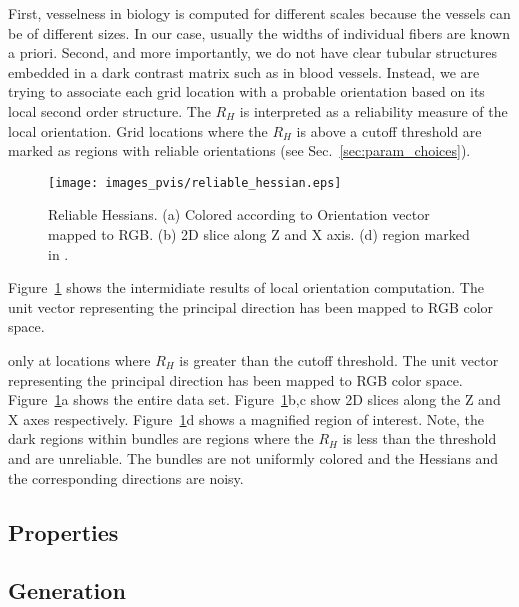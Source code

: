 First, vesselness in biology is computed for different scales because the vessels can be of different sizes. In our case, usually the widths of individual fibers are known a priori.
Second, and more importantly, we do not have clear tubular structures embedded in a dark contrast matrix such as in blood vessels.
Instead, we are trying to associate each grid location  with a probable orientation based on its local second order structure. The $R_{H}$ is interpreted as a reliability measure of the local orientation.
Grid locations where the $R_{H}$ is above a cutoff threshold are marked as regions with reliable orientations (see Sec.~\ref{sec:param_choices}).

\begin{figure}[tb]
\centering
\texttt{[image: images\_pvis/reliable\_hessian.eps]}
 \vspace{-1.5em}
\caption{Reliable Hessians. (a) Colored according to Orientation vector mapped to RGB. (b) 2D slice along Z and X axis. (d)  region marked in .}
\label{fig:reliable_hessian}
\vskip-0.2cm
\end{figure}

Figure~\ref{fig:reliable_hessian}  shows the intermidiate results of local orientation computation.
The unit vector representing the principal direction has been mapped to RGB color space.


 only at locations where $R_{H}$ is greater than the cutoff threshold. The unit vector representing the principal direction has been mapped to RGB color space. Figure~\ref{fig:reliable_hessian}a shows the entire data set. %
Figure~\ref{fig:reliable_hessian}b,c show 2D slices along the Z and X axes respectively. Figure~\ref{fig:reliable_hessian}d shows a magnified region of interest. Note, the dark regions within bundles are regions where the $R_H$ is less than the threshold and are unreliable. The bundles are not uniformly colored and the Hessians and the corresponding directions are noisy.

\subsection{\mt Properties}\label{subsec:mt_properties}
\subsection{\mt Generation}\label{subsec:mt_generation}
